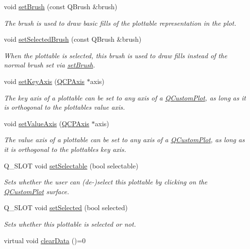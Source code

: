 \begin{DoxyCompactItemize}
void \hyperlink{classQCPAbstractPlottable_a7a4b92144dca6453a1f0f210e27edc74}{set\+Brush} (const Q\+Brush \&brush)
\begin{DoxyCompactList}\small\item\em The brush is used to draw basic fills of the plottable representation in the plot. \end{DoxyCompactList}\item 
void \hyperlink{classQCPAbstractPlottable_ae8c816874089f7a44001e8618e81a9dc}{set\+Selected\+Brush} (const Q\+Brush \&brush)
\begin{DoxyCompactList}\small\item\em When the plottable is selected, this brush is used to draw fills instead of the normal brush set via \hyperlink{classQCPAbstractPlottable_a7a4b92144dca6453a1f0f210e27edc74}{set\+Brush}. \end{DoxyCompactList}\item 
void \hyperlink{classQCPAbstractPlottable_a8524fa2994c63c0913ebd9bb2ffa3920}{set\+Key\+Axis} (\hyperlink{classQCPAxis}{Q\+C\+P\+Axis} $\ast$axis)
\begin{DoxyCompactList}\small\item\em The key axis of a plottable can be set to any axis of a \hyperlink{classQCustomPlot}{Q\+Custom\+Plot}, as long as it is orthogonal to the plottable\textquotesingle{}s value axis. \end{DoxyCompactList}\item 
void \hyperlink{classQCPAbstractPlottable_a71626a07367e241ec62ad2c34baf21cb}{set\+Value\+Axis} (\hyperlink{classQCPAxis}{Q\+C\+P\+Axis} $\ast$axis)
\begin{DoxyCompactList}\small\item\em The value axis of a plottable can be set to any axis of a \hyperlink{classQCustomPlot}{Q\+Custom\+Plot}, as long as it is orthogonal to the plottable\textquotesingle{}s key axis. \end{DoxyCompactList}\item 
Q\+\_\+\+S\+L\+O\+T void \hyperlink{classQCPAbstractPlottable_a22c69299eb5569e0f6bf084877a37dc4}{set\+Selectable} (bool selectable)
\begin{DoxyCompactList}\small\item\em Sets whether the user can (de-\/)select this plottable by clicking on the \hyperlink{classQCustomPlot}{Q\+Custom\+Plot} surface. \end{DoxyCompactList}\item 
Q\+\_\+\+S\+L\+O\+T void \hyperlink{classQCPAbstractPlottable_afbd5428c2952f59d952e11ab5cd79176}{set\+Selected} (bool selected)
\begin{DoxyCompactList}\small\item\em Sets whether this plottable is selected or not. \end{DoxyCompactList}\item 
\hypertarget{classQCPAbstractPlottable_a86e5b8fd4b6ff4f4084e7ea4c573fc53}{}virtual void \hyperlink{classQCPAbstractPlottable_a86e5b8fd4b6ff4f4084e7ea4c573fc53}{clear\+Data} ()=0\label{classQCPAbstractPlottable_a86e5b8fd4b6ff4f4084e7ea4c573fc53}


\end{DoxyCompactItemize}
